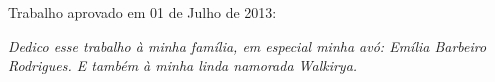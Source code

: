 \documentclass[	12pt, Times, openright, twoside, a4paper, english, brazil]{abntex2}
\begin{document}
%
% 
%
\begin{folhadeaprovacao}
  \begin{center}
    {\ABNTEXchapterfont\large\imprimirautor}

    \vspace*{\fill}\vspace*{\fill}
    {\ABNTEXchapterfont\bfseries\Large\imprimirtitulo}
    \vspace*{\fill}
    
    \hspace{.45\textwidth}
    \begin{minipage}{.5\textwidth}
        \imprimirpreambulo
    \end{minipage}%
    \vspace*{\fill}
   \end{center}
    
   Trabalho aprovado em 01 de Julho de 2013:

      
   \begin{center}
    \vspace*{0.5cm}
    {\large\imprimirlocal}
    \par
    {\large\imprimirdata}
    \vspace*{1cm}
  \end{center}
  
\end{folhadeaprovacao}

\begin{dedicatoria}
   \vspace*{\fill}
   \centering
   \noindent
   \textit{ Dedico esse trabalho à minha família, em especial minha avó: Emília Barbeiro Rodrigues. E também à minha linda namorada Walkirya. } \vspace*{\fill}
\end{dedicatoria}
\end{document}
